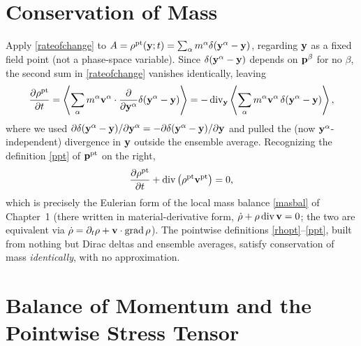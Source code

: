 \section{Conservation of Mass}

Apply \eqref{rateofchange} to $A=\rho^{\rm pt}(\mathbf{y};t)=\sum_\alpha m^\alpha\delta(\mathbf{y}^\alpha-\mathbf{y})$, regarding $\mathbf{y}$ as a fixed field point (not a phase-space variable). Since $\delta(\mathbf{y}^\alpha-\mathbf{y})$ depends on $\mathbf{p}^\beta$ for no $\beta$, the second sum in \eqref{rateofchange} vanishes identically, leaving
\begin{equation}
	\frac{\partial\rho^{\rm pt}}{\partial t} = \left\langle\sum_\alpha m^\alpha \mathbf{v}^\alpha\cdot\frac{\partial}{\partial\mathbf{y}^\alpha}\delta(\mathbf{y}^\alpha-\mathbf{y})\right\rangle = -\operatorname{div}_{\mathbf{y}}\left\langle\sum_\alpha m^\alpha\mathbf{v}^\alpha\,\delta(\mathbf{y}^\alpha-\mathbf{y})\right\rangle,
\end{equation}
where we used $\partial\delta(\mathbf{y}^\alpha-\mathbf{y})/\partial\mathbf{y}^\alpha = -\partial\delta(\mathbf{y}^\alpha-\mathbf{y})/\partial\mathbf{y}$ and pulled the (now $\mathbf{y}^\alpha$-independent) divergence in $\mathbf{y}$ outside the ensemble average. Recognizing the definition \eqref{ppt} of $\mathbf{p}^{\rm pt}$ on the right,
\begin{equation}\label{ikncontinuity}
	\frac{\partial\rho^{\rm pt}}{\partial t} + \operatorname{div}\big(\rho^{\rm pt}\mathbf{v}^{\rm pt}\big) = 0,
\end{equation}
which is precisely the Eulerian form of the local mass balance \eqref{masbal} of Chapter~1 (there written in material-derivative form, $\dot\rho+\rho\operatorname{div}\mathbf{v}=0$; the two are equivalent via $\dot\rho=\partial_t\rho+\mathbf{v}\cdot\operatorname{grad}\rho$). The pointwise definitions \eqref{rhopt}--\eqref{ppt}, built from nothing but Dirac deltas and ensemble averages, satisfy conservation of mass \textit{identically}, with no approximation.

\section{Balance of Momentum and the Pointwise Stress Tensor}

